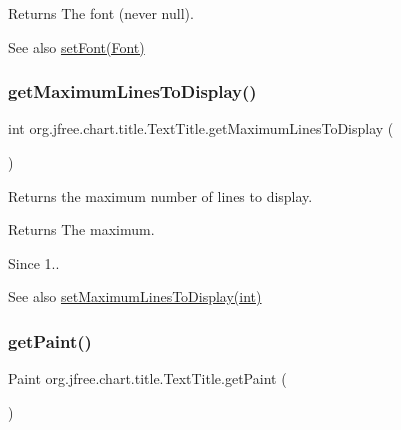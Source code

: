 \begin{DoxyReturn}{Returns}
The font (never {\ttfamily null}).
\end{DoxyReturn}
\begin{DoxySeeAlso}{See also}
\mbox{\hyperlink{classorg_1_1jfree_1_1chart_1_1title_1_1_text_title_a7f3d4b6549f6779a418e98e1e50aea62}{set\+Font(\+Font)}} 
\end{DoxySeeAlso}
\mbox{\label{classorg_1_1jfree_1_1chart_1_1title_1_1_text_title_ac50f9750ffef5ef70eb7b5990d0f50e3}} 
\subsubsection{\texorpdfstring{get\+Maximum\+Lines\+To\+Display()}{getMaximumLinesToDisplay()}}
{\footnotesize\ttfamily int org.\+jfree.\+chart.\+title.\+Text\+Title.\+get\+Maximum\+Lines\+To\+Display (\begin{DoxyParamCaption}{ }\end{DoxyParamCaption})}

Returns the maximum number of lines to display.

\begin{DoxyReturn}{Returns}
The maximum.
\end{DoxyReturn}
\begin{DoxySince}{Since}
1..
\end{DoxySince}
\begin{DoxySeeAlso}{See also}
\mbox{\hyperlink{classorg_1_1jfree_1_1chart_1_1title_1_1_text_title_af91101629f0c35a40042faa41287c421}{set\+Maximum\+Lines\+To\+Display(int)}} 
\end{DoxySeeAlso}
\mbox{\label{classorg_1_1jfree_1_1chart_1_1title_1_1_text_title_a28e3edf87989ddb4c93854709c044aa0}} 
\subsubsection{\texorpdfstring{get\+Paint()}{getPaint()}}
{\footnotesize\ttfamily Paint org.\+jfree.\+chart.\+title.\+Text\+Title.\+get\+Paint (\begin{DoxyParamCaption}{ }\end{DoxyParamCaption})}

